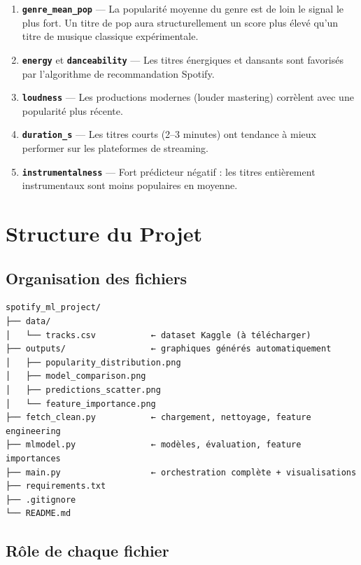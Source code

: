 \documentclass[12pt, a4paper]{article}
\begin{document}
\begin{enumerate}[leftmargin=1.5cm]
  \item \textbf{\texttt{genre\_mean\_pop}} — La popularité moyenne du genre est de loin
        le signal le plus fort. Un titre de pop aura structurellement un score plus élevé
        qu'un titre de musique classique expérimentale.
  \item \textbf{\texttt{energy}} et \textbf{\texttt{danceability}} — Les titres énergiques
        et dansants sont favorisés par l'algorithme de recommandation Spotify.
  \item \textbf{\texttt{loudness}} — Les productions modernes (louder mastering)
        corrèlent avec une popularité plus récente.
  \item \textbf{\texttt{duration\_s}} — Les titres courts (2–3 minutes) ont tendance
        à mieux performer sur les plateformes de streaming.
  \item \textbf{\texttt{instrumentalness}} — Fort prédicteur négatif : les titres
        entièrement instrumentaux sont moins populaires en moyenne.
\end{enumerate}

\section{Structure du Projet}

\subsection{Organisation des fichiers}

\begin{verbatim}
spotify_ml_project/
├── data/
│   └── tracks.csv           ← dataset Kaggle (à télécharger)
├── outputs/                 ← graphiques générés automatiquement
│   ├── popularity_distribution.png
│   ├── model_comparison.png
│   ├── predictions_scatter.png
│   └── feature_importance.png
├── fetch_clean.py           ← chargement, nettoyage, feature engineering
├── mlmodel.py               ← modèles, évaluation, feature importances
├── main.py                  ← orchestration complète + visualisations
├── requirements.txt
├── .gitignore
└── README.md
\end{verbatim}

\subsection{Rôle de chaque fichier}
\end{document}
